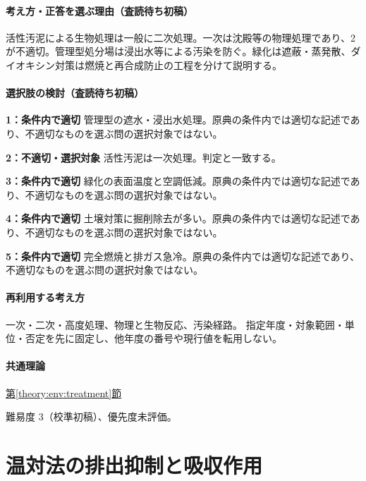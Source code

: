 \paragraph{考え方・正答を選ぶ理由（査読待ち初稿）} 活性汚泥による生物処理は一般に二次処理。一次は沈殿等の物理処理であり、2が不適切。管理型処分場は浸出水等による汚染を防ぐ。緑化は遮蔽・蒸発散、ダイオキシン対策は燃焼と再合成防止の工程を分けて説明する。

\paragraph{選択肢の検討（査読待ち初稿）}\mbox{}\par

\noindent\textbf{1：条件内で適切} 管理型の遮水・浸出水処理。原典の条件内では適切な記述であり、不適切なものを選ぶ問の選択対象ではない。\par

\noindent\textbf{2：不適切・選択対象} 活性汚泥は一次処理。判定と一致する。\par

\noindent\textbf{3：条件内で適切} 緑化の表面温度と空調低減。原典の条件内では適切な記述であり、不適切なものを選ぶ問の選択対象ではない。\par

\noindent\textbf{4：条件内で適切} 土壌対策に掘削除去が多い。原典の条件内では適切な記述であり、不適切なものを選ぶ問の選択対象ではない。\par

\noindent\textbf{5：条件内で適切} 完全燃焼と排ガス急冷。原典の条件内では適切な記述であり、不適切なものを選ぶ問の選択対象ではない。\par

\paragraph{再利用する考え方} 一次・二次・高度処理、物理と生物反応、汚染経路。 指定年度・対象範囲・単位・否定を先に固定し、他年度の番号や現行値を転用しない。

\paragraph{共通理論} \hyperref[theory:env:treatment]{第\ref*{theory:env:treatment}節}

\par 難易度 3（校準初稿）、優先度未評価。

\section{温対法の排出抑制と吸収作用}

